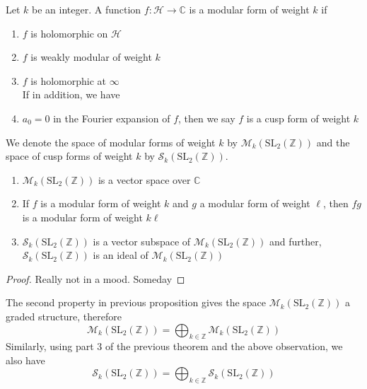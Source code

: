 \documentclass[oneside, 12pt]{scrbook}
\newcommand{\CC}{\mathbb C}
\newcommand{\ZZ}{\mathbb Z}
\newcommand{\SL}{\mathrm{SL}}
\newcommand{\Hh}{\mathcal{H}}
\newcommand{\Mm}{\mathcal{M}}
\newcommand{\Ss}{\mathcal{S}}
\theoremstyle{theorem}
\begin{document}
\begin{definition}
Let $k$ be an integer. A function $f: \Hh \rightarrow \CC$ is a modular form of weight $k$ if 
\begin{enumerate}
\item $f$ is holomorphic on $\Hh$
\item $f$ is weakly modular of weight $k$
\item $f$ is holomorphic at $\infty$ \\

If in addition, we have 
\item $a_{0}=0$ in the Fourier expansion of $f$, then we say $f$ is a cusp form of weight $k$
\end{enumerate}
We denote the space of modular forms of weight $k$ by $\Mm_{k}(\SL_{2}(\ZZ))$ and the space of cusp forms of weight $k$ by $\Ss_{k}(\SL_{2}(\ZZ))$.
\end{definition}

\begin{proposition}[DS, Exercise 1.1.3]
\begin{enumerate}
\item $\Mm_{k}(\SL_{2}(\ZZ))$ is a vector space over $\CC$
\item If $f$ is a modular form of weight $k$ and $g$ a modular form of weight $\ell$, then $fg$ is a modular form of weight $k \ell$
\item $\Ss_{k}(\SL_{2}(\ZZ))$ is a vector subspace of $\Mm_{k}(\SL_{2}(\ZZ))$ and further, $\Ss_{k}(\SL_{2}(\ZZ))$ is an ideal of $\Mm_{k}(\SL_{2}(\ZZ))$
\end{enumerate}
\end{proposition}

\begin{proof}
Really not in a mood. Someday
\end{proof}

\begin{remark}
The second property in previous proposition gives the space $\Mm_{k} (\SL_{2}(\ZZ))$ a graded structure, therefore 
\begin{equation*}
\Mm_{k} (\SL_{2}(\ZZ)) = \bigoplus_{k \in \ZZ}\Mm_{k} (\SL_{2}(\ZZ))
\end{equation*}
Similarly, using part $3$ of the previous theorem and the above observation, we also have 
\begin{equation*}
\Ss_{k} (\SL_{2}(\ZZ)) = \bigoplus_{k \in \ZZ}\Ss_{k} (\SL_{2}(\ZZ))
\end{equation*}
\end{remark}
\end{document}

